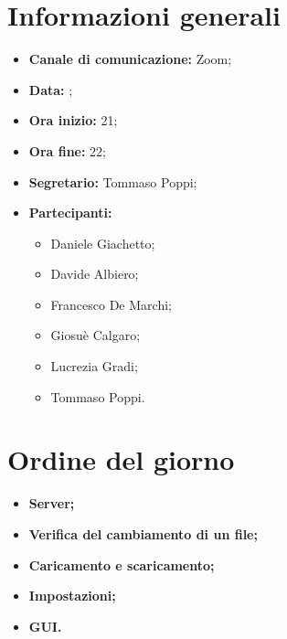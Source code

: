 \section{Informazioni generali}

\begin{itemize}

	\item \textbf{Canale di comunicazione:} Zoom;
	
	\item \textbf{Data:} \DataMeeting{};
	
	\item \textbf{Ora inizio:} 21;
	
	\item \textbf{Ora fine:} 22;
	
	\item \textbf{Segretario:} Tommaso Poppi;
	
	\item \textbf{Partecipanti:}
	
		\begin{itemize}

			\item Daniele Giachetto;
			\item Davide Albiero;
			\item Francesco De Marchi;
			\item Giosuè Calgaro;
			\item Lucrezia Gradi;
			\item Tommaso Poppi.

		\end{itemize}

\end{itemize}



\section{Ordine del giorno}

\begin{itemize}

	\item\textbf{Server;}
	
	\item\textbf{Verifica del cambiamento di un file;}
	
	\item\textbf{Caricamento e scaricamento;}

	\item\textbf{Impostazioni;}
	
	\item\textbf{GUI.}

\end{itemize}

